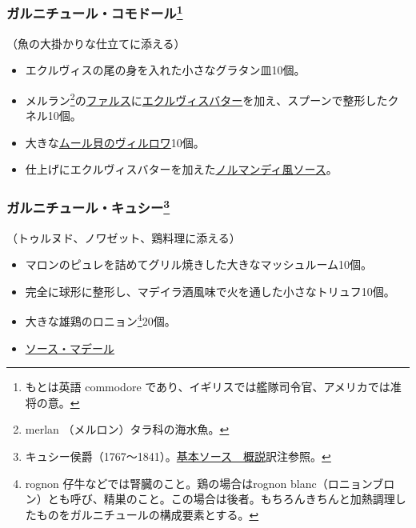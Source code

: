 \begin{recette}
\hypertarget{garniture-a-la-commodore}{%
\subsubsection[ガルニチュール・コモドール]{\texorpdfstring{ガルニチュール・コモドール\footnote{もとは英語
  commodore であり、イギリスでは艦隊司令官、アメリカでは准将の意。}}{ガルニチュール・コモドール}}\label{garniture-a-la-commodore}}



（魚の大掛かりな仕立てに添える）

\begin{itemize}
\item
  エクルヴィスの尾の身を入れた小さなグラタン皿10個。
\item
  メルラン\footnote{merlan （メルロン）タラ科の海水魚。}の\protect\hyperlink{farce-a}{ファルス}に\protect\hyperlink{beurre-d-ecrevissse}{エクルヴィスバター}を加え、スプーンで整形したクネル10個。
\item
  大きな\protect\hyperlink{moules-a-la-villeroy}{ムール貝のヴィルロワ}10個。
\item
  仕上げにエクルヴィスバターを加えた\protect\hyperlink{sauce-normande}{ノルマンディ風ソース}。
\end{itemize}

\hypertarget{garniture-cussy}{%
\subsubsection[ガルニチュール・キュシー]{\texorpdfstring{ガルニチュール・キュシー\footnote{キュシー侯爵（1767〜1841）。\protect\hyperlink{osbservation-sur-la-sauce}{基本ソース　概説}訳注参照。}}{ガルニチュール・キュシー}}\label{garniture-cussy}}



（トゥルヌド、ノワゼット、鶏料理に添える）

\begin{itemize}
\item
  マロンのピュレを詰めてグリル焼きした大きなマッシュルーム10個。
\item
  完全に球形に整形し、マデイラ酒風味で火を通した小さなトリュフ10個。
\item
  大きな雄鶏のロニョン\footnote{rognon
    仔牛などでは腎臓のこと。鶏の場合はrognon
    blanc（ロニョンブロン）とも呼び、精巣のこと。この場合は後者。もちろんきちんと加熱調理したものをガルニチュールの構成要素とする。}20個。
\item
  \protect\hyperlink{sauce-madere}{ソース・マデール}
\end{itemize}


\end{recette}
